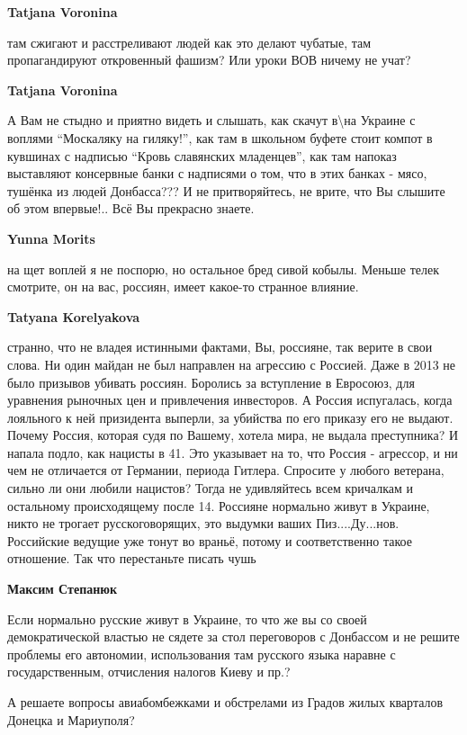 \begin{itemize}
\begin{itemize}
\textbf{Tatjana Voronina} 

там сжигают и расстреливают людей как это делают чубатые, там пропагандируют
откровенный фашизм? Или уроки ВОВ ничему не учат?

\textbf{Tatjana Voronina} 

А Вам не стыдно и приятно видеть и слышать, как скачут в\textbackslash на Украине с воплями
\enquote{Москаляку на гиляку!}, как там в школьном буфете стоит компот в кувшинах с
надписью \enquote{Кровь славянских младенцев}, как там напоказ выставляют консервные
банки с надписями о том, что в этих банках - мясо, тушёнка из людей Донбасса???
И не притворяйтесь, не врите, что Вы слышите об этом впервые!.. Всё Вы
прекрасно знаете.

\textbf{Yunna Morits} 

на щет воплей я не поспорю, но остальное бред сивой кобылы. Меньше телек
смотрите, он на вас, россиян, имеет какое-то странное влияние.

\textbf{Tatyana Korelyakova} 

странно, что не владея истинными фактами, Вы, россияне, так верите в свои
слова. Ни один майдан не был направлен на агрессию с Россией. Даже в 2013 не
было призывов убивать россиян. Боролись за вступление в Евросоюз, для уравнения
рыночных цен и привлечения инвесторов. А Россия испугалась, когда лояльного к
ней призидента выперли, за убийства по его приказу его не выдают. Почему
Россия, которая судя по Вашему, хотела мира, не выдала преступника? И напала
подло, как нацисты в 41. Это указывает на то, что Россия - агрессор, и ни чем
не отличается от Германии, периода Гитлера. Спросите у любого ветерана, сильно
ли они любили нацистов? Тогда не удивляйтесь всем кричалкам и остальному
происходящему после 14. Россияне нормально живут в Украине, никто не трогает
русскоговорящих, это выдумки ваших Пиз....Ду...нов. Российские ведущие уже
тонут во враньё, потому и соответственно такое отношение. Так что перестаньте
писать чушь

\textbf{Максим Степанюк}

Если нормально русские живут в Украине, то что же вы со своей демократической
властью не сядете за стол переговоров с Донбассом и не решите проблемы его
автономии, использования там русского языка наравне с государственным,
отчисления налогов Киеву и пр.?


А решаете вопросы авиабомбежками и обстрелами из Градов жилых кварталов Донецка
и Мариуполя?


\end{itemize}
\end{itemize}
